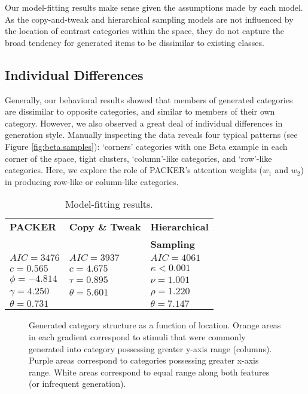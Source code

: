 \documentclass[10pt,letterpaper]{article}
\newcommand\inputpgf[2]{{
\let\pgfimageWithoutPath\pgfimage
\renewcommand{\pgfimage}[2][]{\pgfimageWithoutPath[##1]{#1/##2}}

}}
\begin{document}
Our model-fitting results make sense given the assumptions made by each model. As the copy-and-tweak and hierarchical sampling models are not influenced by the location of contrast categories within the space, they do not capture the broad tendency for generated items to be dissimilar to existing classes. 


\subsection{Individual Differences}

Generally, our behavioral results showed that members of generated categories are dissimilar to opposite categories, and similar to members of their own category. However, we also observed a great deal of individual differences in generation style. Manually inspecting the data reveals four typical patterns (see Figure \ref{fig:beta.samples}): `corners' categories with one Beta example in each corner of the space, tight clusters, `column'-like categories, and `row'-like categories. Here, we explore the role of PACKER's attention weights ($w_1$ and $w_2$) in producing row-like or column-like categories.

\begin{table}
\centering
\caption{Model-fitting results.}
\label{table:model-fits}
\begin{tabular}{ l l l}
\\
 \textbf{PACKER} & \textbf{Copy \& Tweak} & \textbf{Hierarchical} \\
 & & \textbf{Sampling} \\ \hline
 $AIC = 3476$ & $AIC = 3937$ & $AIC = 4061$  \\ 
 $c=0.565$ & $c=4.675$  & $\kappa<0.001$\\
$\phi=-4.814$ & $\tau=0.895$ & $\nu=1.001$ \\ 
$\gamma=4.250$ & $\theta=5.601$ &  $\rho=1.220$  \\ 
 $\theta=0.731$ &  & $\theta = 7.147$  \\ 
\end{tabular}
\end{table}

\begin{figure*}
    \begin{center}
    \inputpgf{figs/}{range-diff-gradient.pgf}
    \caption{Generated category structure as a function of location. Orange areas in each gradient correspond to stimuli that were commonly generated into category possessing greater y-axis range (columns). Purple areas correspond to categories possessing greater x-axis range. White areas correspond to equal range along both features (or infrequent generation).}
    \label{fig:range-diff-gradient}
    \end{center}
\end{figure*}
\end{document}
